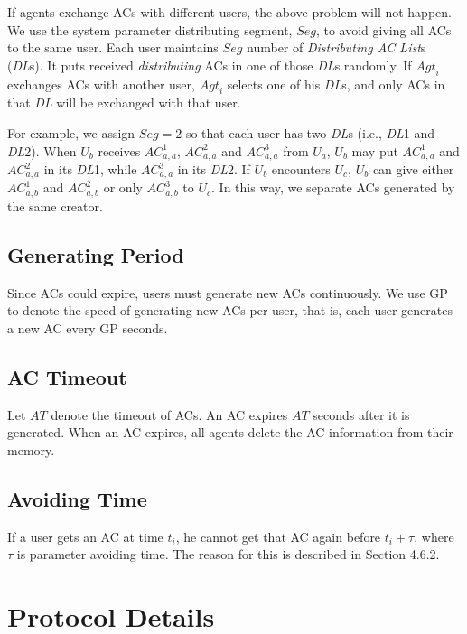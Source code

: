 If agents exchange ACs with different users, the above problem will not happen. We use the system parameter distributing segment, $Seg$, to avoid giving all ACs to the same user. Each user maintains $Seg$ number of \textit{Distributing AC List}s (\textit{DL}s). It puts received \textit{distributing} ACs in one of those \textit{DL}s randomly. If ${Agt}_i$ exchanges ACs with another user, ${Agt}_i$ selects one of his \textit{DL}s, and only ACs in that \textit{DL} will be exchanged with that user.

For example, we assign $Seg=2$ so that each user has two \textit{DL}s (i.e., \textit{DL}1 and \textit{DL}2). When $U_b$ receives ${AC}^1_{a,a}$, ${AC}^2_{a,a}$ and ${AC}^3_{a,a}$ from $U_a$, $U_b$ may put ${AC}^1_{a,a}$ and ${AC}^2_{a,a}$ in its \textit{DL}1, while ${AC}^3_{a,a}$ in its \textit{DL}2. If $U_b$ encounters $U_c$, $U_b$ can give either ${AC}^1_{a,b}$ and ${AC}^2_{a,b}$ or only ${AC}^3_{a,b}$ to $U_c$. In this way, we separate ACs generated by the same creator.


\subsection{ Generating Period}

\noindent Since ACs could expire, users must generate new ACs continuously. We use GP to denote the speed of generating new ACs per user, that is, each user generates a new AC every GP seconds.


\subsection{ AC Timeout}

\noindent Let $AT$ denote the timeout of ACs. An AC expires $AT$ seconds after it is generated. When an AC expires, all agents delete the AC information from their memory.


\subsection{ Avoiding Time}

\noindent If a user gets an AC at time $t_i$, he cannot get that AC again before $t_i+\tau $, where $\tau$ is parameter avoiding time. The reason for this is described in Section 4.6.2.


\section{ Protocol Details}


